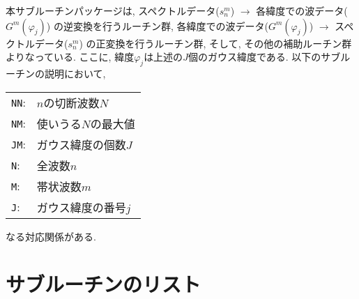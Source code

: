 \documentclass[a4j]{jarticle}
\begin{document}
本サブルーチンパッケージは, 
スペクトルデータ($s^m_n$) 
$\to$ 各緯度での波データ($G^m(\varphi_j)$) 
の逆変換を行うルーチン群,
各緯度での波データ($G^m(\varphi_j)$) 
$\to$ スペクトルデータ($s^m_n$) 
の正変換を行うルーチン群,
そして, その他の補助ルーチン群よりなっている.
ここに, 
緯度$\varphi_j$は上述の$J$個のガウス緯度である.
以下のサブルーチンの説明において,
\begin{center}
\begin{tabular}{ll}
\texttt{NN}:& $n$の切断波数$N$\\
\texttt{NM}:& 使いうる$N$の最大値\\
\texttt{JM}:& ガウス緯度の個数$J$\\
\texttt{N}:& 全波数$n$\\
\texttt{M}:& 帯状波数$m$\\
\texttt{J}:& ガウス緯度の番号$j$\\
\end{tabular}
\end{center}
なる対応関係がある.


\section{サブルーチンのリスト}
\end{document}
